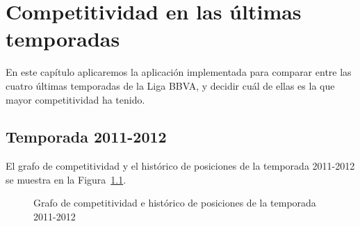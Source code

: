 \chapter{Competitividad en las últimas temporadas}

En este capítulo aplicaremos la aplicación implementada para comparar entre las cuatro últimas temporadas de la Liga BBVA, y decidir cuál de ellas es la que mayor competitividad ha tenido.\\

\section{Temporada 2011-2012}

El grafo de competitividad y el histórico de posiciones de la temporada 2011-2012 se muestra en la Figura~\ref{fig:grafo-2011-2012}.


\begin{figure}[htbp]
\centering
{}
\caption[Competitividad de la temporada 2011-2012]{Grafo de competitividad e histórico de posiciones de la temporada 2011-2012} \label{fig:grafo-2011-2012}
\end{figure}

